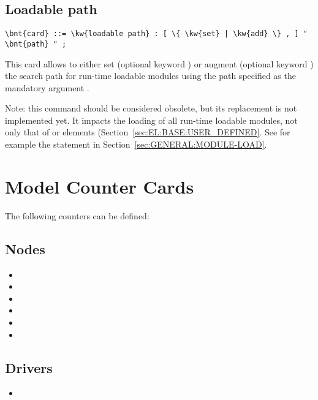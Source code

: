 \subsection{Loadable path}
\label{sec:CONTROLDATA:LOADABLE_PATH}
\begin{Verbatim}[commandchars=\\\{\}]
    \bnt{card} ::= \kw{loadable path} : [ \{ \kw{set} | \kw{add} \} , ] " \bnt{path} " ;
\end{Verbatim}
This card allows to either set (optional keyword )
or augment (optional keyword ) the search path
for run-time loadable modules using the path specified
as the mandatory argument .

Note: this command should be considered obsolete, but its replacement
is not implemented yet.
It impacts the loading of all run-time loadable modules,
not only that of  or  elements
(Section~\ref{sec:EL:BASE:USER_DEFINED}.
See for example the  statement
in Section~\ref{sec:GENERAL:MODULE-LOAD}.



\section{Model Counter Cards}
The following counters can be defined:
\subsection{Nodes}
\begin{itemize}
\item {}
\item {}
\item {}
\item {}
\item {}
\item {}
\end{itemize}

\subsection{Drivers}
\begin{itemize}
\item {}
\end{itemize}

